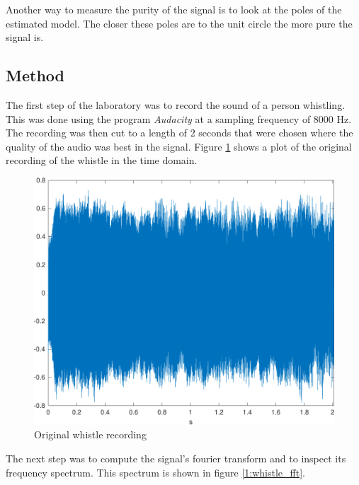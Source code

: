 \documentclass{IEEEtran}
\begin{document}
Another way to measure the purity of the signal is to look at the poles
of the estimated model. The closer these poles are to the unit circle
the more pure the signal is.

\subsection{Method}
The first step of the laboratory was to record the sound of a person
whistling. This was done using the program \textit{Audacity}
\cite{audacity} at a sampling frequency of 8000 Hz. The recording was then
cut to a length of 2 seconds that were chosen where the quality of the
audio was best in the signal. Figure \ref{1:whistle_orig} shows a plot
of the original recording of the whistle in the time domain.

\begin{figure}[h]
  \centering
  \captionsetup{justification=centering}

  \includegraphics[width=0.8\columnwidth]{pictures/whistle_orig.pdf}
  \caption{Original whistle recording}
  \label{1:whistle_orig}

\end{figure}

The next step was to compute the signal's fourier transform and to
inspect its frequency spectrum. This spectrum is shown in figure
\ref{1:whistle_fft}.
\end{document}
